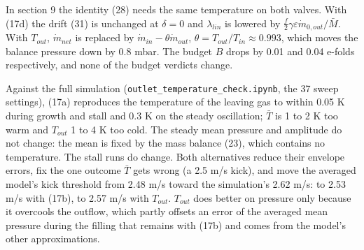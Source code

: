 In section 9 the identity (28) needs the same temperature on both valves. With (17d) the drift (31) is unchanged at $\delta = 0$ and $\lambda_{lin}$ is lowered by $\tfrac{f}{2}\gamma\varepsilon\dot m_{0,out}/\bar M$. With $T_{out}$, $\dot m_{net}$ is replaced by $\dot m_{in} - \theta\dot m_{out}$, $\theta = T_{out}/T_{in} \approx 0.993$, which moves the balance pressure down by 0.8 mbar. The budget $B$ drops by 0.01 and 0.04 e-folds respectively, and none of the budget verdicts change.

Against the full simulation (\texttt{outlet\_temperature\_check.ipynb}, the 37 sweep settings), (17a) reproduces the temperature of the leaving gas to within 0.05 K during growth and stall and 0.3 K on the steady oscillation; $\bar T$ is 1 to 2 K too warm and $T_{out}$ 1 to 4 K too cold. The steady mean pressure and amplitude do not change: the mean is fixed by the mass balance (23), which contains no temperature. The stall runs do change. Both alternatives reduce their envelope errors, fix the one outcome $\bar T$ gets wrong (a 2.5 m/s kick), and move the averaged model's kick threshold from 2.48 m/s toward the simulation's 2.62 m/s: to 2.53 m/s with (17b), to 2.57 m/s with $T_{out}$. $T_{out}$ does better on pressure only because it overcools the outflow, which partly offsets an error of the averaged mean pressure during the filling that remains with (17b) and comes from the model's other approximations.
